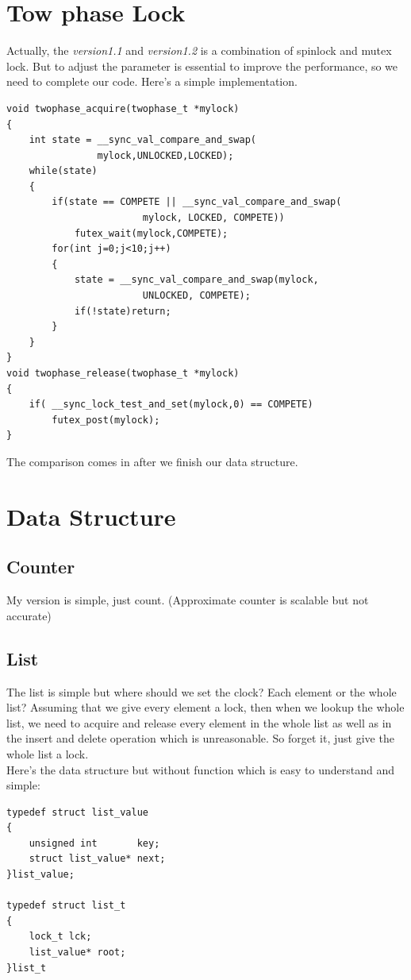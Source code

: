 \documentclass{article}
\begin{document}
	\section{Tow phase Lock}
		Actually, the \textit{version1.1} and \textit{version1.2} is a combination of spinlock and mutex lock. But to adjust the parameter is essential to improve the performance, so we need to complete our code. Here's a simple implementation. \\
		\begin{lstlisting}
void twophase_acquire(twophase_t *mylock)
{
	int state = __sync_val_compare_and_swap(
				mylock,UNLOCKED,LOCKED);
    while(state)
	{
		if(state == COMPETE || __sync_val_compare_and_swap(
						mylock, LOCKED, COMPETE))
			futex_wait(mylock,COMPETE);
		for(int j=0;j<10;j++)
		{
			state = __sync_val_compare_and_swap(mylock, 
						UNLOCKED, COMPETE);
			if(!state)return;
		}
	}
}
void twophase_release(twophase_t *mylock)
{
	if( __sync_lock_test_and_set(mylock,0) == COMPETE)
		futex_post(mylock);
}
		\end{lstlisting}
		The comparison comes in after we finish our data structure.
	\section{Data Structure}
		\subsection{\textbf{Counter}}
		My version is simple, just count. (Approximate counter is scalable but not accurate)\\
		\subsection{\textbf{List}}
		The list is simple but where should we set the clock? Each element or the whole list? Assuming that we give every element a lock, then when we lookup the whole list, we need to acquire and release every element in the whole list as well as in the insert and delete operation which is unreasonable. So forget it, just give the whole list a lock. \\
		Here's the data structure but without function which is easy to understand and simple: \\
		\begin{lstlisting}
typedef struct list_value
{
	unsigned int	   key;
	struct list_value* next;
}list_value;

typedef struct list_t
{
	lock_t lck;
	list_value* root;
}list_t
		\end{lstlisting}
\end{document}

